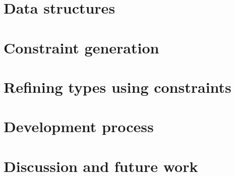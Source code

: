 \documentclass[a4paper]{article}
\begin{document}
\section{Data structures}


\section{Constraint generation}

\section{Refining types using constraints}

\section{Development process}


\section{Discussion and future work}

\end{document}
